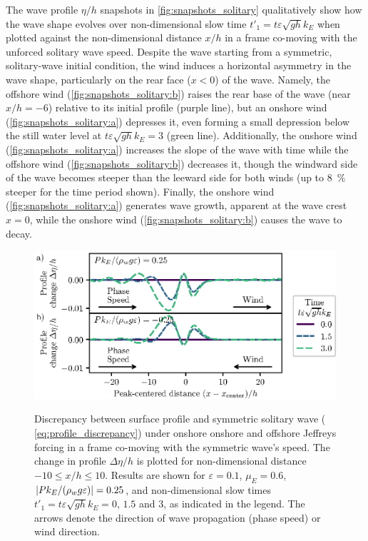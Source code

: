 \documentclass{jfm}
\renewcommand*{\epsilon}{\varepsilon}
\begin{document}
The wave profile $\eta/h$ snapshots in \cref{fig:snapshots_solitary}
qualitatively show how the wave shape evolves over non-dimensional slow
time $t'_1 = t \epsilon \sqrt{g h} k_E$ when plotted against the
non-dimensional distance $x/h$ in a frame co-moving with the unforced
solitary wave speed.
Despite the wave starting from a symmetric, solitary-wave initial
condition, the wind induces a horizontal asymmetry in the wave shape,
particularly on the rear face ($x<0$) of the wave.
Namely, the offshore wind (\cref{fig:snapshots_solitary:b}) raises the
rear base of the wave (near $x/h = -6$) relative to its initial profile
(purple line), but an onshore wind (\cref{fig:snapshots_solitary:a})
depresses it, even forming a small depression below the still water
level at $t\epsilon \sqrt{gh} k_E=3$ (green line).
Additionally, the onshore wind (\cref{fig:snapshots_solitary:a})
increases the slope of the wave with time while the offshore wind
(\cref{fig:snapshots_solitary:b}) decreases it, though the windward side
of the wave becomes steeper than the leeward side for both winds (up to
\SI{8}{\percent} steeper for the time period shown).
Finally, the onshore wind (\cref{fig:snapshots_solitary:a}) generates
wave growth, apparent at the wave crest $x=0$, while the onshore wind
(\cref{fig:snapshots_solitary:b}) causes the wave to decay.

\begin{figure}
  \centering
  { %
    \label{fig:snapshots_solitary_tail:a}
    \label{fig:snapshots_solitary_tail:b}
  }
  \includegraphics{Snapshots-Positive-Negative-Tail.eps}
  \caption{
    Discrepancy between surface profile and symmetric solitary wave
    (\cf{} \cref{eq:profile_discrepancy}) under onshore
     onshore and
     offshore Jeffreys forcing in
    a frame co-moving with the symmetric wave's speed.
    The change in profile $\Delta \eta/h$ is plotted for non-dimensional
    distance $-10 \le x/h \le 10$.
    Results are shown for $\epsilon=0.1$, $\mu_E = 0.6$, $\abs{P
    k_E/(\rho_w g \epsilon)} = 0.25$, and non-dimensional slow times
    $t'_1 = t \epsilon \sqrt{gh} k_E = 0$, $1.5$ and $3$, as indicated
    in the legend.
    The arrows denote the direction of wave propagation (phase speed) or
    wind direction.
  }\label{fig:snapshots_solitary_tail}
\end{figure}
\end{document}
